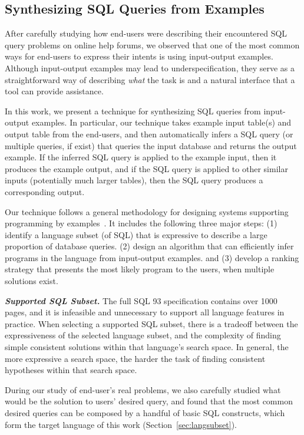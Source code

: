 \subsection{Synthesizing SQL Queries from Examples}

After carefully studying how end-users were describing their
encountered SQL query problems on online help forums, we observed that
one of the most common ways for end-users to
express their intents is using input-output examples. Although
input-output examples may lead to underspecification, they
serve as a straightforward way of describing \textit{what} the
task is and a natural interface that a tool can provide assistance.


In this work, we present a technique for synthesizing SQL queries
from input-output examples. In particular, our technique takes example input
table(s) and output table from the end-users, and then automatically
infers a SQL query (or multiple queries, if exist) that queries
the input database and returns the output example. If the inferred
SQL query is applied
to the example input, then it produces the example output, and if the
SQL query is applied to other similar inputs (potentially much larger tables),
then the SQL query produces a corresponding output.

Our technique follows a general methodology for designing
systems supporting programming by examples~\cite{Harris:2011}.
It includes the following three major steps:
(1) identify a language subset (of SQL) that is expressive to
describe a large proportion of %
database queries. (2) design an algorithm that
can efficiently infer programs in the language from input-output
examples. and (3) develop a ranking strategy that presents
the most likely program to the users, when multiple solutions exist.

\vspace{1mm}
\noindent \textbf{\textit{Supported SQL Subset.}}
The full SQL 93 specification contains over 1000 pages, and it is
infeasible and unnecessary to support all language features in practice.
When selecting a supported SQL subset, there is a tradeoff
between the expressiveness of the selected language subset,
and the complexity of finding simple consistent solutions
within that language's search space.  In general, the more expressive a search
space, the harder the task of finding consistent hypotheses within
that search space. 

During our study of end-user's real problems, we also carefully studied what would
be the solution to users' desired query, and found that the most common
desired queries can be composed by a handful of basic SQL constructs,
which form the target language of this work (Section~\ref{sec:langsubset}).

